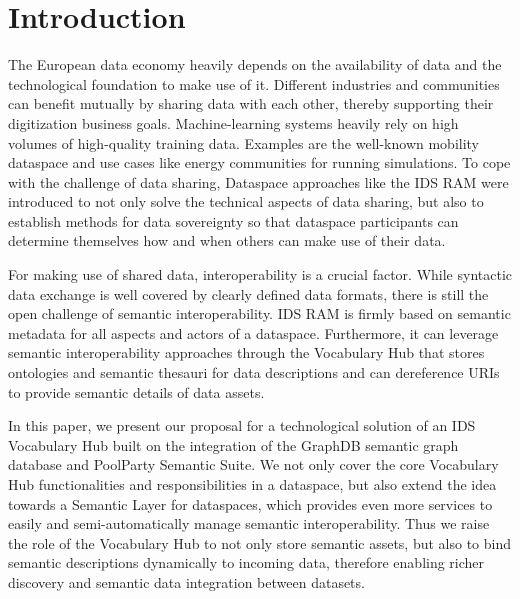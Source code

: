 \documentclass[manuscript,screen]{acmart}
\begin{document}



\maketitle

\setlength{\parskip}{-0.1pt}

\section{Introduction}\label{introduction}

The European data economy heavily depends on the availability of data
and the technological foundation to make use of it. Different industries
and communities can benefit mutually by sharing data with each other,
thereby supporting their digitization business goals. Machine-learning
systems heavily rely on high volumes of high-quality training data.
Examples are the well-known mobility dataspace and use cases like energy
communities for running simulations. To cope with the challenge of data
sharing, Dataspace approaches like the IDS RAM were introduced to not
only solve the technical aspects of data sharing, but also to establish
methods for data sovereignty so that dataspace participants can
determine themselves how and when others can make use of their data.

For making use of shared data, interoperability is a crucial factor.
While syntactic data exchange is well covered by clearly defined data
formats, there is still the open challenge of semantic interoperability.
IDS RAM is firmly based on semantic metadata for all aspects and actors
of a dataspace. Furthermore, it can leverage semantic interoperability
approaches through the Vocabulary Hub that stores ontologies and
semantic thesauri for data descriptions and can dereference URIs to
provide semantic details of data assets.

In this paper, we present our proposal for a technological solution of
an IDS Vocabulary Hub built on the integration of the GraphDB semantic
graph database and PoolParty Semantic Suite. We not only cover the core
Vocabulary Hub functionalities and responsibilities in a dataspace, but
also extend the idea towards a Semantic Layer for dataspaces, which
provides even more services to easily and semi-automatically manage
semantic interoperability. Thus we raise the role of the Vocabulary Hub
to not only store semantic assets, but also to bind semantic
descriptions dynamically to incoming data, therefore enabling richer
discovery and semantic data integration between datasets.
\end{document}
